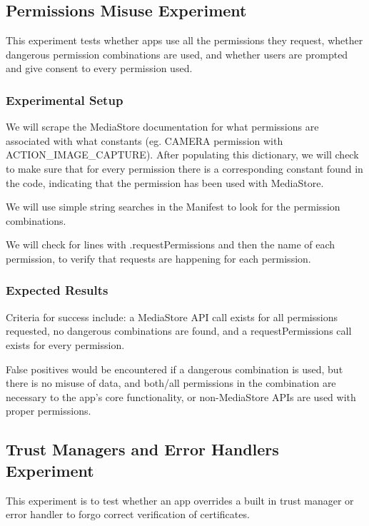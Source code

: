 \documentclass[10pt,twocolumn,pdftex]{article}
\begin{document}
\subsection{Permissions Misuse Experiment}

    This experiment tests whether apps use all the permissions they request, whether dangerous permission combinations are used, and whether users are prompted and give consent to every permission used.

    \subsubsection{Experimental Setup}
    We will scrape the MediaStore documentation for what permissions are associated with what constants (eg. CAMERA permission with ACTION\_IMAGE\_CAPTURE). After populating this dictionary, we will check to make sure that for every permission there is a corresponding constant found in the code, indicating that the permission has been used with MediaStore.

    We will use simple string searches in the Manifest to look for the permission combinations. 

    We will check for lines with .requestPermissions and then the name of each permission, to verify that requests are happening for each permission.

    \subsubsection{Expected Results}

    Criteria for success include:
    a MediaStore API call exists for all permissions requested, 
    no dangerous combinations are found, and
    a requestPermissions call exists for every permission.

    False positives would be encountered if 
    a dangerous combination is used, but there is no misuse of data, and both/all permissions in the combination are necessary to the app’s core functionality, or 
    non-MediaStore APIs are used with proper permissions.


\subsection{Trust Managers and Error Handlers Experiment}
    This experiment is to test whether an app overrides a built in trust manager or error handler to forgo correct verification of certificates. 
\end{document}
